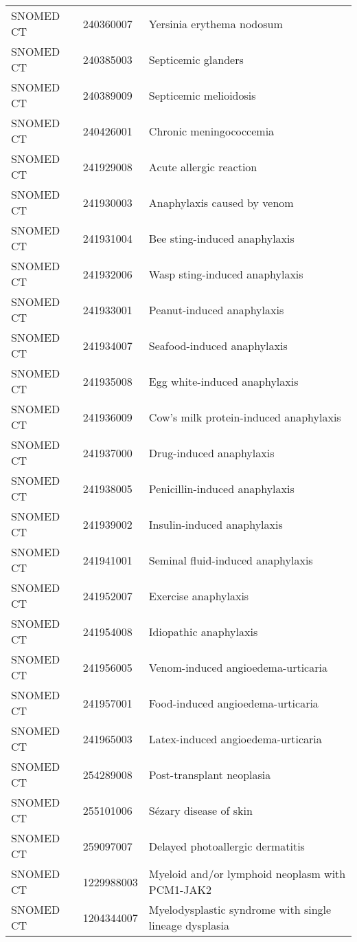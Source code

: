 \begin{longtable}{p{}p{}p{}}
  SNOMED CT & 240360007 & Yersinia erythema nodosum \\ 
  SNOMED CT & 240385003 & Septicemic glanders \\ 
  SNOMED CT & 240389009 & Septicemic melioidosis \\ 
  SNOMED CT & 240426001 & Chronic meningococcemia \\ 
  SNOMED CT & 241929008 & Acute allergic reaction \\ 
  SNOMED CT & 241930003 & Anaphylaxis caused by venom \\ 
  SNOMED CT & 241931004 & Bee sting-induced anaphylaxis \\ 
  SNOMED CT & 241932006 & Wasp sting-induced anaphylaxis \\ 
  SNOMED CT & 241933001 & Peanut-induced anaphylaxis \\ 
  SNOMED CT & 241934007 & Seafood-induced anaphylaxis \\ 
  SNOMED CT & 241935008 & Egg white-induced anaphylaxis \\ 
  SNOMED CT & 241936009 & Cow's milk protein-induced anaphylaxis \\ 
  SNOMED CT & 241937000 & Drug-induced anaphylaxis \\ 
  SNOMED CT & 241938005 & Penicillin-induced anaphylaxis \\ 
  SNOMED CT & 241939002 & Insulin-induced anaphylaxis \\ 
  SNOMED CT & 241941001 & Seminal fluid-induced anaphylaxis \\ 
  SNOMED CT & 241952007 & Exercise anaphylaxis \\ 
  SNOMED CT & 241954008 & Idiopathic anaphylaxis \\ 
  SNOMED CT & 241956005 & Venom-induced angioedema-urticaria \\ 
  SNOMED CT & 241957001 & Food-induced angioedema-urticaria \\ 
  SNOMED CT & 241965003 & Latex-induced angioedema-urticaria \\ 
  SNOMED CT & 254289008 & Post-transplant neoplasia \\ 
  SNOMED CT & 255101006 & Sézary disease of skin \\ 
  SNOMED CT & 259097007 & Delayed photoallergic dermatitis \\ 
  SNOMED CT & 1229988003 & Myeloid and/or lymphoid neoplasm with PCM1-JAK2 \\ 
  SNOMED CT & 1204344007 & Myelodysplastic syndrome with single lineage dysplasia \\ 

\end{longtable}
